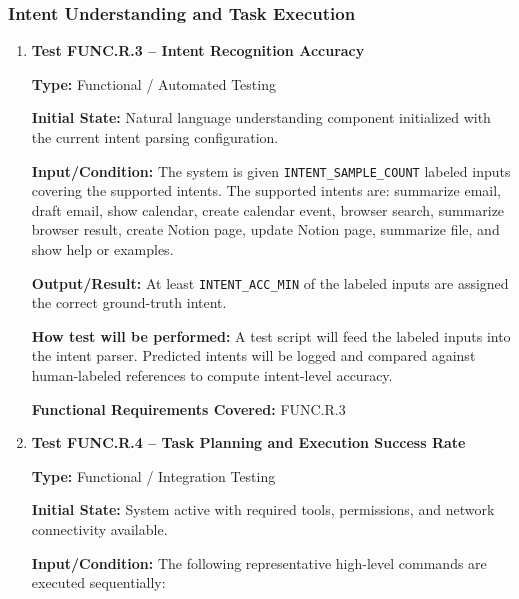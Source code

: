 \documentclass[12pt, titlepage]{article}
\begin{document}
\subsubsection{Intent Understanding and Task Execution}

\begin{enumerate}

\item \textbf{Test FUNC.R.3 -- Intent Recognition Accuracy}

\textbf{Type:} Functional / Automated Testing

\textbf{Initial State:} Natural language understanding component
initialized with the current intent parsing configuration.

\textbf{Input/Condition:} The system is given
\texttt{INTENT\_SAMPLE\_COUNT} labeled inputs covering the supported
intents. The supported intents are: summarize email, draft email, show
calendar, create calendar event, browser search, summarize browser
result, create Notion page, update Notion page, summarize file, and show
help or examples.

\textbf{Output/Result:} At least \texttt{INTENT\_ACC\_MIN} of the
labeled inputs are assigned the correct ground-truth intent.

\textbf{How test will be performed:} A test script will feed the labeled
inputs into the intent parser. Predicted intents will be logged and
compared against human-labeled references to compute intent-level
accuracy.

\textbf{Functional Requirements Covered:} FUNC.R.3

\item \textbf{Test FUNC.R.4 -- Task Planning and Execution Success Rate}

\textbf{Type:} Functional / Integration Testing

\textbf{Initial State:} System active with required tools, permissions,
and network connectivity available.

\textbf{Input/Condition:} The following representative high-level
commands are executed sequentially:


\end{enumerate}
\end{document}
